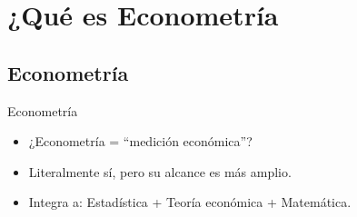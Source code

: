 \section{¿Qué es Econometría}

\subsection{Econometría}
\begin{frame}{Econometría}
	\begin{itemize}
		\item ¿Econometría = ``medición económica''? \pause
		\item Literalmente sí, pero su alcance es más amplio.\pause
		\item Integra a: Estadística + Teoría económica + Matemática.\pause
	\end{itemize}
\end{frame}

